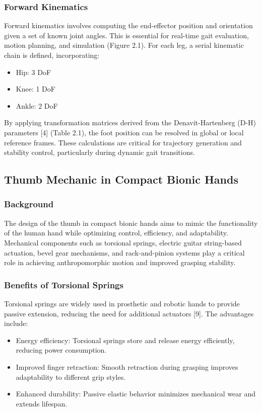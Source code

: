 \subsubsection*{Forward Kinematics}

Forward kinematics involves computing the end-effector position and orientation given a set of known joint angles. This is essential for real-time gait evaluation, motion planning, and simulation (Figure 2.1). For each leg, a serial kinematic chain is defined, incorporating:
\begin{itemize}
    \item Hip: 3 DoF
    \item Knee: 1 DoF
    \item Ankle: 2 DoF
\end{itemize}

By applying transformation matrices derived from the Denavit-Hartenberg (D-H) parameters [4] (Table 2.1), the foot position can be resolved in global or local reference frames. These calculations are critical for trajectory generation and stability control, particularly during dynamic gait transitions.

\subsection{Thumb Mechanic in Compact Bionic Hands}

\subsubsection*{Background}

The design of the thumb in compact bionic hands aims to mimic the functionality of the human hand while optimizing control, efficiency, and adaptability. Mechanical components such as torsional springs, electric guitar string-based actuation, bevel gear mechanisms, and rack-and-pinion systems play a critical role in achieving anthropomorphic motion and improved grasping stability.

\subsubsection*{Benefits of Torsional Springs}

Torsional springs are widely used in prosthetic and robotic hands to provide passive extension, reducing the need for additional actuators [9]. The advantages include:
\begin{itemize}
    \item Energy efficiency: Torsional springs store and release energy efficiently, reducing power consumption.
    \item Improved finger retraction: Smooth retraction during grasping improves adaptability to different grip styles.
    \item Enhanced durability: Passive elastic behavior minimizes mechanical wear and extends lifespan.
\end{itemize}


